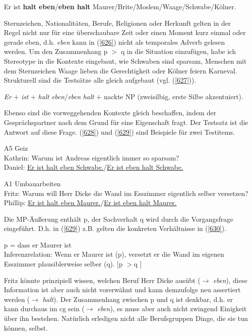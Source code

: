 \begin{exe}
	\ex\label{626} 
	 Er ist \textbf{halt eben}/\textbf{eben halt} Maurer/Brite/Moslem/Waage/Schwabe/Kölner.
\end{exe}
Sternzeichen, Nationalitäten, Berufe, Religionen oder Herkunft gelten in der Regel nicht nur für eine überschaubare Zeit oder einen Moment \glqq kurz einmal\grqq{} oder \glqq gerade eben\grqq{}, d.h. \textit{eben} kann in (\ref{626}) nicht als temporales Adverb gelesen werden. Um den Zusammenhang p $>$ q in die Situation einzufügen, habe ich Stereotype in die Kontexte eingebaut, wie \glqq Schwaben sind sparsam\grqq{}, \glqq Menschen mit dem Sternzeichen Waage lieben die Gerechtigkeit\grqq{} oder \glqq Kölner feiern Karneval\grqq{}. Strukturell sind die Testsätze alle gleich aufgebaut (vgl. (\ref{627})).

\begin{exe}
	\ex\label{627} 
	 \textit{Er} $\plus$ \textit{ist} $\plus$ \textit{halt eben}/\textit{eben halt} $\plus$ nackte NP (zweisilbig, erste Silbe akzentuiert).
\end{exe}	
Ebenso sind die vorweggehenden Kontexte gleich beschaffen, indem der Gesprächs\-partner nach dem Grund für eine Eigenschaft fragt. Der Testsatz ist die Antwort auf diese Frage. (\ref{628}) und (\ref{629}) sind Beispiele für zwei Testitems.

\begin{exe}
	\ex\label{628} 
	 A5 Geiz\\
	Kathrin: Warum ist Andreas eigentlich immer so sparsam?\\
	Daniel: \underline{Er ist halt eben Schwabe.}/\underline{Er ist eben halt Schwabe.}
\end{exe}	

\begin{exe}
	\ex\label{629} 
	A1 Umbauarbeiten\\
	Fritz: Warum will Herr Dicke die Wand im Esszimmer eigentlich selber versetzen?\\
	Phillip: \underline{Er ist halt eben Maurer.}/\underline{Er ist eben halt Maurer.}
\end{exe}	
Die MP-Äußerung enthält p, der Sachverhalt q wird durch die Vorgangsfrage eingeführt. D.h. in (\ref{629}) z.B. gelten die konkreten Verhältnisse in (\ref{630}).

\begin{exe}
	\ex\label{630} 
	p = dass er Maurer ist\\
	Inferenzrelation: Wenn er Maurer ist (p), versetzt er die Wand im eigenen Esszimmer plausiblerweise selber (q). $[$p $>$q		$]$
\end{exe}
Fritz könnte prinzipiell wissen, welchen Beruf Herr Dicke ausübt ($\rightarrow$ \textit{eben}), diese Information ist aber auch nicht vorerwähnt und kann demzufolge neu assertiert werden ($\rightarrow$ \textit{halt}). Der Zusammenhang zwischen p und q ist denkbar, d.h. er kann durchaus im cg sein ($\rightarrow$ \textit{eben}), es muss aber auch nicht zwingend Einigkeit über ihn bestehen. Natürlich erledigen nicht alle Berufsgruppen Dinge, die sie tun können, selbst. 

